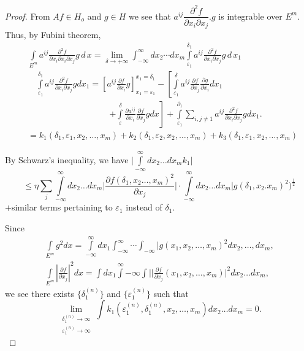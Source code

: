 \begin{proof}
 From $Af \in H_o$ and $g \in H$ we see that $a^{ij} \dfrac{\partial
 ^2 f }{\partial x_i \partial x_j}. g$ is integrable over
 $E^m$. Thus, by Fubini theorem,  
 \begin{align*}
   & \int\limits_{ E^m} a^{ij} \frac{\partial^2 f }{\partial x_i
   \partial x_i \partial x_j} g \,d \,x 
   = \lim_{\delta \to + \infty}\int^{\infty}_{- \infty} dx_2 \cdots dx_m
  \int\limits^{\delta_1}_{ \varepsilon_1} a^{ij} \frac{\partial^2
   f}{\partial x_i \partial x_j} g \,d \,x_1\\ 
   & \quad \int\limits_{\varepsilon
  _1}^{ \delta_1} a^{ij} \frac{\partial^2 f}{\partial x_i \partial
   x_j} gdx_1 
   = \left[a^{ij} \frac{\partial f }{\partial x_i} g \right]^{x_1 =
   \delta_1}_{x_1= \varepsilon_1} 
   - \left[\int\limits_{\varepsilon_1}^{\delta} a^{ij}
         \frac{\partial f}{\partial x_j} \frac{\partial g}{\partial x_i} dx
        _1 \right.\\ 
         & \hspace{4cm} \left. + \int\limits_{\varepsilon}^{\delta} \frac{\partial
          a^{ij}}{\partial x_i} \frac{\partial f }{\partial
          x_j} g d x \right] 
   + \int\limits^{ \partial_1}_{\varepsilon_1} \sum_{i, j \neq 1} a^{ij}
        \frac{\partial^2 f}{\partial x_i \partial x_j} g d x_1. \\ 
        & = k_1 (\delta_1, \varepsilon_1, x_2, \ldots, x_m)
        + k_2 (\delta_1, \varepsilon_2, x_2, \ldots, x_m) + k_3
        (\delta_1, \varepsilon_1, x_2, \ldots, x_m) 
 \end{align*}
 
 By Schwarz's inequality, we have $\big| \int\limits^\infty_{ -
  \infty}dx_2 \ldots dx_m k_1 \big| $ 
{\fontsize{10pt}{12pt}\selectfont
 $$
 \leq \eta \sum_j \int\limits^{\infty}_{- \infty} dx_2 \ldots dx_m \big
 | \frac{\partial f (\delta_1, x_2 \ldots, x_m)^2}{\partial x_j}\big
 | \cdot \int\limits^{ \infty}_{- \infty} dx_2 \ldots dx_m | g (\delta
_1, x_2. x_m)^2 )^{\frac{1}{2}} 
 $$ }
 $+$\pageoriginale similar terms pertaining to $\varepsilon_1$ instead of $\delta_1$. 
 
 Since 
 \begin{gather*}
  \int\limits_{ E^m} g^2 dx = \int\limits^{\infty}_{- \infty} dx_1
  \int^{\infty}_{ - \infty} \cdots \int_{- \infty }| g(x_1, x_2,
  \ldots, x_m)^2 d x_2, \ldots, d x_m, \\ 
  \int\limits_{E^m} | \frac{\partial f}{\partial x_j}|^2 dx = \int
  dx_1 
  \int\limits^{ \infty}{-\infty} \int |
  |\frac{\partial f}{\partial x_j} (x_1, x_2, \ldots, x_m)|^2 dx_2
  \ldots dx_m, 
 \end{gather*}
 we see there exists $\{ \delta^{(n)}_1\}$ and $\{ \varepsilon_1^(n)\}$
such that  
 $$
 \lim\limits_{\substack{\delta_1^{(n)} \to
     \infty\\ \varepsilon_1^{(n)}\to \infty}} \int k_1
 (\varepsilon_1^{(n)}, \delta^{(n)}_{1}, x_2, \ldots, x_m) dx_2 \ldots dx_m = 0. 
 $$
 

\end{proof}
